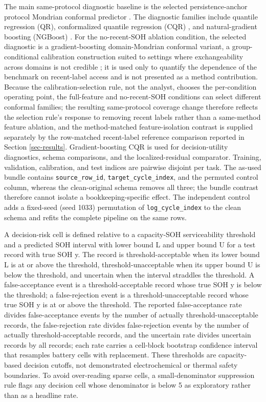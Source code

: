 \documentclass[
  number,
  preprint]{elsarticle}
\begin{document}
The main same-protocol diagnostic baseline is the selected
persistence-anchor protocol Mondrian conformal predictor
\citep{vovk2005algorithmic}. The diagnostic families include quantile
regression (QR), conformalized quantile regression (CQR)
\citep{romano2019conformalized}, and natural-gradient boosting (NGBoost)
\citep{duan2020ngboost}. For the no-recent-SOH ablation condition, the
selected diagnostic is a gradient-boosting domain-Mondrian conformal
variant, a group-conditional calibration construction suited to settings
where exchangeability across domains is not credible
\citep{barber2023beyond}; it is used only to quantify the dependence of
the benchmark on recent-label access and is not presented as a method
contribution. Because the calibration-selection rule, not the analyst,
chooses the per-condition operating point, the full-feature and
no-recent-SOH conditions can select different conformal families; the
resulting same-protocol coverage change therefore reflects the selection
rule's response to removing recent labels rather than a same-method
feature ablation, and the method-matched feature-isolation contrast is
supplied separately by the row-matched recent-label reference comparison
reported in Section \ref{sec-results}. Gradient-boosting CQR is used for
decision-utility diagnostics, schema comparisons, and the
localized-residual comparator. Training, validation, calibration, and
test indices are pairwise disjoint per task. The as-used bundle contains
\texttt{source\_row\_id}, \texttt{target\_cycle\_index}, and the
permuted control column, whereas the clean-original schema removes all
three; the bundle contrast therefore cannot isolate a
bookkeeping-specific effect. The independent control adds a fixed-seed
(seed 1033) permutation of \texttt{log\_cycle\_index} to the clean
schema and refits the complete pipeline on the same rows.

A decision-risk cell is defined relative to a capacity-SOH
serviceability threshold and a predicted SOH interval with lower bound L
and upper bound U for a test record with true SOH y. The record is
threshold-acceptable when its lower bound L is at or above the
threshold, threshold-unacceptable when its upper bound U is below the
threshold, and uncertain when the interval straddles the threshold. A
false-acceptance event is a threshold-acceptable record whose true SOH y
is below the threshold; a false-rejection event is a
threshold-unacceptable record whose true SOH y is at or above the
threshold. The reported false-acceptance rate divides false-acceptance
events by the number of actually threshold-unacceptable records, the
false-rejection rate divides false-rejection events by the number of
actually threshold-acceptable records, and the uncertain rate divides
uncertain records by all records; each rate carries a cell-block
bootstrap confidence interval that resamples battery cells with
replacement. These thresholds are capacity-based decision cutoffs, not
demonstrated electrochemical or thermal safety boundaries. To avoid
over-reading sparse cells, a small-denominator suppression rule flags
any decision cell whose denominator is below 5 as exploratory rather
than as a headline rate.
\end{document}
